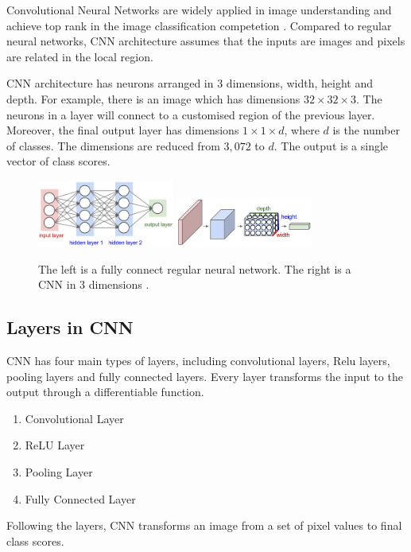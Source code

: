Convolutional Neural Networks \citep{lecun1998gradient} are widely applied in image understanding and achieve top rank in the image classification competetion \citep{krizhevsky2012imagenet}. Compared to regular neural networks, CNN architecture assumes that the inputs are images and pixels are related in the local region.

CNN architecture has neurons arranged in 3 dimensions, width, height and depth. For example, there is an image which has dimensions $32\times 32\times 3$. The neurons in a layer will connect to a customised region of the previous layer. Moreover, the final output layer has dimensions $1\times 1\times d$, where $d$ is the number of classes. The dimensions are reduced from $3,072$ to $d$. The output is a single vector of class scores.

\graphicspath{ {./Figures/} }
\begin{figure}[!htb]
\centering
\includegraphics[width=0.4\textwidth]{neural_net2.jpeg}
\includegraphics[width=0.4\textwidth]{cnn.jpeg}
\caption{\label{fig:compareCNNandFC}The left is a fully connect regular neural network. The right is a CNN in 3 dimensions \citep{CNNDiagram}.}
\end{figure}

\subsection{Layers in CNN}
CNN has four main types of layers, including convolutional layers, Relu layers, pooling layers and fully connected layers. Every layer transforms the input to the output through a differentiable function. 
\begin{enumerate}
  \item Convolutional Layer
  \item ReLU Layer
  \item Pooling Layer
  \item Fully Connected Layer
\end{enumerate}
Following the layers, CNN transforms an image from a set of pixel values to final class scores.

